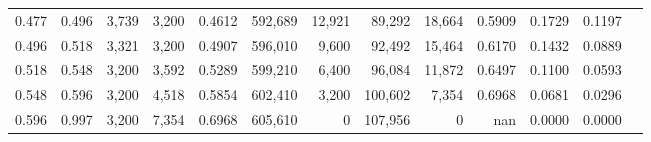 \begin{tabular}{rrrrrrrrrrrrr}
0.477 & 0.496 &   3,739 & 3,200 &                                     0.4612 & 592,689 &  12,921 &  89,292 &  18,664 & 0.5909 & 0.1729 & 0.1197 \\
0.496 & 0.518 &   3,321 & 3,200 &                                     0.4907 & 596,010 &   9,600 &  92,492 &  15,464 & 0.6170 & 0.1432 & 0.0889 \\
0.518 & 0.548 &   3,200 & 3,592 &                                     0.5289 & 599,210 &   6,400 &  96,084 &  11,872 & 0.6497 & 0.1100 & 0.0593 \\
0.548 & 0.596 &   3,200 & 4,518 &                                     0.5854 & 602,410 &   3,200 & 100,602 &   7,354 & 0.6968 & 0.0681 & 0.0296 \\
0.596 & 0.997 &   3,200 & 7,354 &                                     0.6968 & 605,610 &       0 & 107,956 &       0 &    nan & 0.0000 & 0.0000 \\
\bottomrule
\end{tabular}
